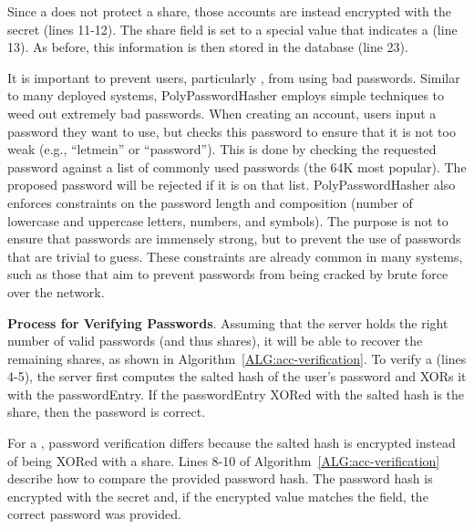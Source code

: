Since a \thresholdlessaccount does not protect a share, those accounts are
instead encrypted with the secret (lines 11-12).  The share field is set to a
special value that indicates a \thresholdlessaccount (line 13).  As before,
this information is then stored in the database (line 23).
 
It is important to prevent users, particularly \thresholdaccounts, from using bad
passwords.  Similar to many deployed systems, PolyPasswordHasher employs simple
techniques to weed out extremely bad passwords.  When creating an account,
users input a password they want to use, but \PPH checks this password to ensure
that it is not too weak (e.g., ``letmein'' or ``password'').  This is done by
checking the requested password against a list of commonly used passwords (the
64K most popular). The proposed password will be rejected if it is on
that list.  PolyPasswordHasher also enforces constraints on the password length
and composition (number of lowercase and uppercase letters, numbers, and
symbols).  The purpose is not to ensure that passwords are immensely strong,
but to prevent the use of \thresholdaccount  passwords that are trivial to
guess.  These constraints are already common in many systems, such as those
that aim to prevent passwords from being cracked by brute force over the
network.  


{\bf Process for Verifying Passwords}. Assuming that the server holds the
right number of valid passwords (and thus shares), it will be able to recover
the remaining shares, as shown in Algorithm~\ref{ALG:acc-verification}.
To verify a \thresholdaccount  (lines 4-5), the server first computes the salted
hash of the user’s password and XORs it with the passwordEntry. If the
passwordEntry XORed with the salted hash is the share, then the password is
correct.  

For a \thresholdlessaccount, password verification differs because the salted hash
is encrypted instead of being XORed with a share.  Lines 8-10 of
Algorithm~\ref{ALG:acc-verification} describe how to compare the provided password
hash.  The password hash is encrypted with the secret and, if the encrypted
value matches the \sxh field, the correct password was provided.  




